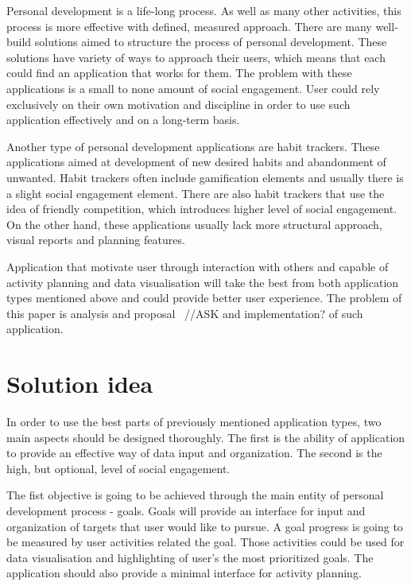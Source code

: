 Personal development is a life-long process.
As well as many other activities, this process is more effective with defined, measured approach.
There are many well-build solutions aimed to structure the process of personal development.
These solutions have variety of ways to approach their users, which means that each could find an application that works for them.
The problem with these applications is a small to none amount of social engagement.
User could rely exclusively on their own motivation and discipline in order to use such application effectively and on a long-term basis.

Another type of personal development applications are habit trackers.
These applications aimed at development of new desired habits and abandonment of unwanted.
Habit trackers often include gamification elements and usually there is a slight social engagement element.
There are also habit trackers that use the idea of friendly competition, which introduces higher level of social engagement.
On the other hand, these applications usually lack more structural approach, visual reports and planning features.

Application that motivate user through interaction with others and capable of activity planning and data visualisation
will take the best from both application types mentioned above and could provide better user experience.
The problem of this paper is analysis and proposal ~{\color{gray}//ASK and implementation?} of such application.


\section{Solution idea}\label{sec:solution-idea}

In order to use the best parts of previously mentioned application types, two main aspects should be designed thoroughly.
The first is the ability of application to provide an effective way of data input and organization.
The second is the high, but optional, level of social engagement.

The fist objective is going to be achieved through the main entity of personal development process - goals.
Goals will provide an interface for input and organization of targets that user would like to pursue.
A goal progress is going to be measured by user activities related the goal.
Those activities could be used for data visualisation and highlighting of user's the most prioritized goals.
The application should also provide a minimal interface for activity planning.

